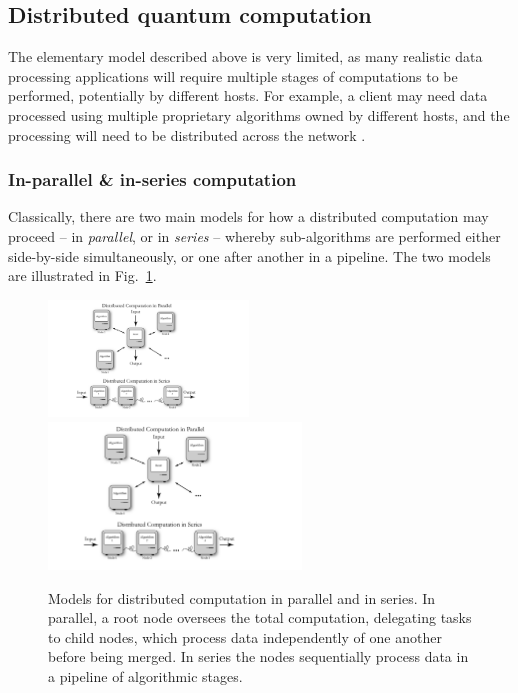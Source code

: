 %
%

\subsection{Distributed quantum computation} \label{sec:dist_QC} 

The elementary model described above is very limited, as many realistic data processing applications will require multiple stages of computations to be performed, potentially by different hosts. For example, a client may need data processed using multiple proprietary algorithms owned by different hosts, and the processing will need to be distributed across the network \cite{bib:Cirac99}.

\subsubsection{In-parallel \& in-series computation}

Classically, there are two main models for how a distributed computation may proceed -- in \textit{parallel}, or in \textit{series} -- whereby sub-algorithms are performed either side-by-side simultaneously, or one after another in a pipeline. The two models are illustrated in Fig.~\ref{fig:distributed}.

\begin{figure}[!htbp]
\pubmode
	\includegraphics[clip=true, width=0.475\textwidth]{distributed}
\else
	\includegraphics[clip=true, width=0.6\textwidth]{distributed}
\fi
\captionspacefig \caption{Models for distributed computation in parallel and in series. In parallel, a root node oversees the total computation, delegating tasks to child nodes, which process data independently of one another before being merged. In series the nodes sequentially process data in a pipeline of algorithmic stages.} \label{fig:distributed}
\end{figure}


